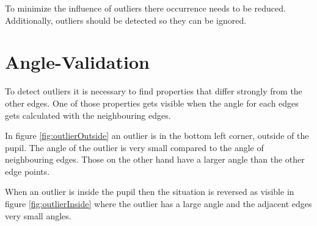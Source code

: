 To minimize the influence of outliers there occurrence needs to be reduced. Additionally, outliers should be detected so they can be ignored.

\section{Angle-Validation}
\label{sec:angleValidation}
To detect outliers it is necessary to find properties that differ strongly from the other edges. One of those properties gets visible when the angle for each edges gets calculated with the neighbouring edges.

In figure \ref{fig:outlierOutside} an outlier is in the bottom left corner, outside of the pupil. The angle of the outlier is very small compared to the angle of neighbouring edges. Those on the other hand have a larger angle than the other edge points.

When an outlier is inside the pupil then the situation is reversed as visible in figure \ref{fig:outlierInside} where the outlier has a large angle and the adjacent edges very small angles.

